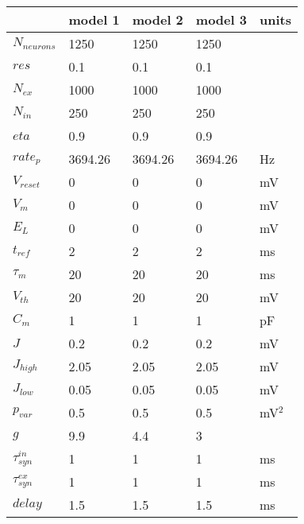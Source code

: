 \begin{tabular}{lllll}
\toprule
{} &    model 1 &    model 2 &    model 3 &       units \\
\midrule
$N_{neurons}$         &       1250 &       1250 &       1250 &             \\
$res$                 &        0.1 &        0.1 &        0.1 &             \\
$N_{ex}$              &       1000 &       1000 &       1000 &             \\
$N_{in}$              &        250 &        250 &        250 &             \\
$eta$                 &        0.9 &        0.9 &        0.9 &             \\
$rate_{p}$            &    3694.26 &    3694.26 &    3694.26 &          Hz \\
$V_{reset}$           &          0 &          0 &          0 &          mV \\
$V_{m}$               &          0 &          0 &          0 &          mV \\
$E_{L}$               &          0 &          0 &          0 &          mV \\
$t_{ref}$             &          2 &          2 &          2 &          ms \\
$\tau_{m}$            &         20 &         20 &         20 &          ms \\
$V_{th}$              &         20 &         20 &         20 &          mV \\
$C_{m}$               &          1 &          1 &          1 &          pF \\
$J$                   &        0.2 &        0.2 &        0.2 &          mV \\
$J_{high}$            &       2.05 &       2.05 &       2.05 &          mV \\
$J_{low}$             &       0.05 &       0.05 &       0.05 &          mV \\
$p_{var}$             &        0.5 &        0.5 &        0.5 &      mV$^2$ \\
$g$                   &        9.9 &        4.4 &          3 &             \\
$\tau_{syn}^{in}$     &          1 &          1 &          1 &          ms \\
$\tau_{syn}^{ex}$     &          1 &          1 &          1 &          ms \\
$delay$               &        1.5 &        1.5 &        1.5 &          ms \\

\end{tabular}
